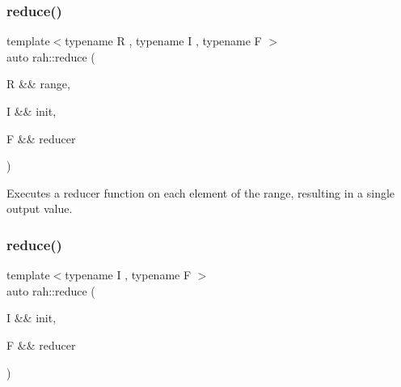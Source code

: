 \mbox{\label{namespacerah_a407b50a4f029e3f2a3cd0ba9142aea84}} 
\subsubsection{\texorpdfstring{reduce()}{reduce()}\hspace{0.1cm}{\footnotesize\ttfamily [1/2]}}
{\footnotesize\ttfamily template$<$typename R , typename I , typename F $>$ \\
auto rah\+::reduce (\begin{DoxyParamCaption}\item[{R \&\&}]{range,  }\item[{I \&\&}]{init,  }\item[{F \&\&}]{reducer }\end{DoxyParamCaption})}



Executes a reducer function on each element of the range, resulting in a single output value. 


\begin{DoxyCodeInclude}{0}
\end{DoxyCodeInclude}
\mbox{\label{namespacerah_a6a6b7b7e3b78bb4bd16372fbb688c152}} 
\subsubsection{\texorpdfstring{reduce()}{reduce()}\hspace{0.1cm}{\footnotesize\ttfamily [2/2]}}
{\footnotesize\ttfamily template$<$typename I , typename F $>$ \\
auto rah\+::reduce (\begin{DoxyParamCaption}\item[{I \&\&}]{init,  }\item[{F \&\&}]{reducer }\end{DoxyParamCaption})}



